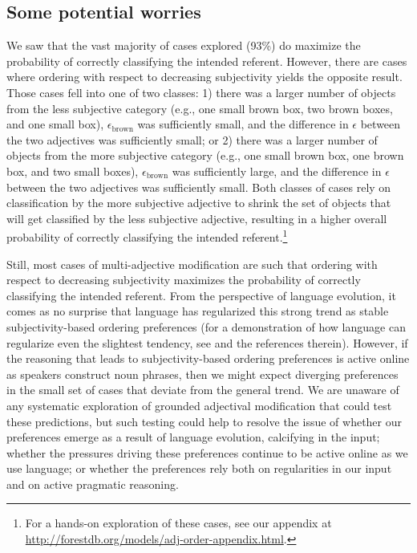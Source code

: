 \documentclass{sp}
\begin{document}
\subsection{Some potential worries}

We saw that the vast majority of cases explored (93\%) do maximize the probability of correctly classifying the intended referent. However, there are cases where ordering with respect to decreasing subjectivity yields the opposite result. Those cases %
fell into one of two classes: 1) there was a larger number of objects from the less subjective category (e.g., one small brown box, two brown boxes, and one small box), $\epsilon_{\textrm{brown}}$ was sufficiently small, and the difference in $\epsilon$ between the two adjectives was sufficiently small; or 2) there was a larger number of objects from the more subjective category (e.g., one small brown box, one brown box, and two small boxes), $\epsilon_{\textrm{brown}}$ was sufficiently large, and the difference in $\epsilon$ between the two adjectives was sufficiently small. Both classes of cases rely on classification by the more subjective adjective to shrink the set of objects that will get classified by the less subjective adjective, resulting in a higher overall probability of correctly classifying the intended referent.\footnote{For a hands-on exploration of these cases, see our appendix at \href{http://forestdb.org/models/adj-order-appendix.html}{http://forestdb.org/models/adj-order-appendix.html}.}


Still, most cases of multi-adjective modification are such that ordering with respect to decreasing subjectivity maximizes the probability of correctly classifying the intended referent. From the perspective of language evolution, it comes as no surprise that language has regularized this strong trend as stable subjectivity-based ordering preferences (for a demonstration of how language can regularize even the slightest tendency, see \citealp{kirby2017} and the references therein). However, if the reasoning that leads to subjectivity-based ordering preferences is active online as speakers construct noun phrases, then we might expect diverging preferences in the small set of cases that deviate from the general trend. We are unaware of any systematic exploration of grounded adjectival modification that could test these predictions, but such testing could help to resolve the issue of whether our preferences emerge as a result of language evolution, calcifying in the input; whether the pressures driving these preferences continue to be active online as we use language; or whether the preferences rely both on regularities in our input and on active pragmatic reasoning.
 
\end{document}
